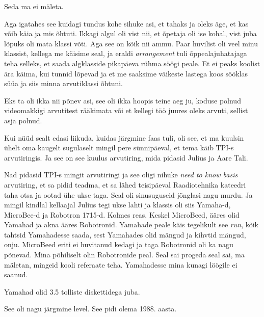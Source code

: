 
Seda ma ei mäleta. 

Aga igatahes see kuidagi tundus kohe sihuke asi, et tahaks ja oleks äge, et kas võib käia ja mis õhtuti. Ikkagi algul oli vist nii, et õpetaja oli ise kohal, vist  juba lõpuks oli mata klassi võti. Aga see on kõik nii ammu. Paar huvilist oli veel minu klassist, kellega me käisime seal, ja eraldi \emph{arrangement} tuli õppealajuhatajaga teha selleks, et saada algklasside pikapäeva rühma söögi peale. Et ei peaks koolist ära käima, kui tunnid lõpevad ja et me saaksime väikeste lastega koos sööklas süüa ja siis minna arvutiklassi õhtuni. 

Eks ta oli ikka nii põnev asi, see oli ikka hoopis teine aeg ju,  koduse polnud videomakkigi arvutitest rääkimata või et kellegi töö juures oleks arvuti, sellist asja polnud. 

Kui nüüd sealt edasi liikuda, kuidas järgmine faas tuli, oli see, et ma kuulsin ühelt oma kaugelt sugulaselt mingil pere sünnipäeval, et tema käib TPI-s arvutiringis. Ja see on see kuulus arvutiring, mida pidasid Julius ja Aare Tali. 

Nad pidasid TPI-s mingit arvutiringi ja see oligi nihuke \emph{need to know basis} arvutiring, et sa pidid teadma, et sa lähed teisipäeval Raadiotehnika kateedri taha otsa ja ootad ühe ukse taga. Seal oli sinusuguseid jõnglasi nagu murdu. Ja mingil kindlal kellaajal Julius tegi ukse lahti ja klassis oli siis Yamaha-d, MicroBee-d ja Robotron 1715-d. Kolmes reas. Keskel MicroBeed,  ääres olid Yamahad ja akna ääres Robotronid. Yamahade peale käis tegelikult see \emph{run},  kõik tahtsid Yamahadesse saada, sest Yamahades olid mängud ja kihvtid mängud, onju. MicroBeed eriti ei huvitanud kedagi ja taga Robotronid oli ka nagu põnevad. Mina põhiliselt olin Robotronide peal. Seal sai progeda seal sai, ma mäletan, mingeid kooli referaate teha. Yamahadesse mina kunagi löögile ei saanud. 

Yamahad olid 3.5 tolliste diskettidega juba. 

See oli nagu järgmine level. See pidi olema 1988. aasta.


